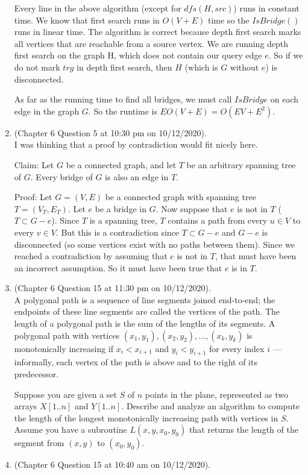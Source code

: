 \documentclass{article}
\begin{document}
\begin{enumerate}
        Every line in the above algorithm (except for $dfs(H, src)$) runs in constant time. We know that first search runs in $O(V + E)$ time so the $IsBridge()$ runs in linear time. The algorithm is correct because depth first search marks all vertices that are reachable from a source vertex. We are running depth first search on the graph H, which does not contain our query edge $e$. So if we do not mark $trg$ in depth first search, then $H$ (which is $G$ without $e$) is disconnected.

        As far as the running time to find all bridges, we must call $IsBridge$ on each edge in the graph $G$. So the runtime is $EO(V + E) = O(EV + E^2)$.
    \item (Chapter 6 Question 5 at 10:30 pm on 10/12/2020). \\
        I was thinking that a proof by contradiction would fit nicely here.

        Claim: Let $G$ be a connected graph, and let $T$ be an arbitrary spanning tree of $G$.
        Every bridge of $G$ is also an edge in $T$.

        Proof: Let $G = (V, E)$ be a connected graph with spanning tree $T = (V_T, E_T)$.
        Let $e$ be a bridge in $G$.
        Now suppose that $e$ is not in $T$ ($T \subset G - e$).
        Since $T$ is a spanning tree, $T$ contains a path from every $u \in V$ to every $v \in V$.
        But this is a contradiction since $T \subset G - e$ and $G- e$ is disconnected (so some vertices exist with no paths between them).
        Since we reached a contradiction by assuming that $e$ is not in $T$, that must have been an incorrect assumption.
        So it must have been true that $e$ is in $T$.
    \item (Chapter 6 Question 15 at 11:30 pm on 10/12/2020). \\
        A polygonal path is a sequence of line segments joined end-to-end; the endpoints of these line segments are called the vertices of the path.
        The length of a polygonal path is the sum of the lengths of its segments.
        A polygonal path with vertices $(x_1, y_1), (x_2, y_2), ... ,(x_k, y_k)$ is monotonically increasing if $x_i < x_{i+1}$ and $y_i < y_{i+1}$ for every index $i$ --- informally, each vertex of the path is above and to the right of its predecessor.

        Suppose you are given a set $S$ of $n$ points in the plane, represented as two arrays $X[1 .. n]$ and $Y [1 .. n]$.
        Describe and analyze an algorithm to compute the length of the longest monotonically increasing path with vertices in $S$.
        Assume you have a subroutine $L(x, y, x_0, y_0)$ that returns the length of the segment from $(x, y)$ to $(x_0, y_0)$.
    \item (Chapter 6 Question 15 at 10:40 am on 10/12/2020). \\
        
\end{enumerate}
\end{document}
